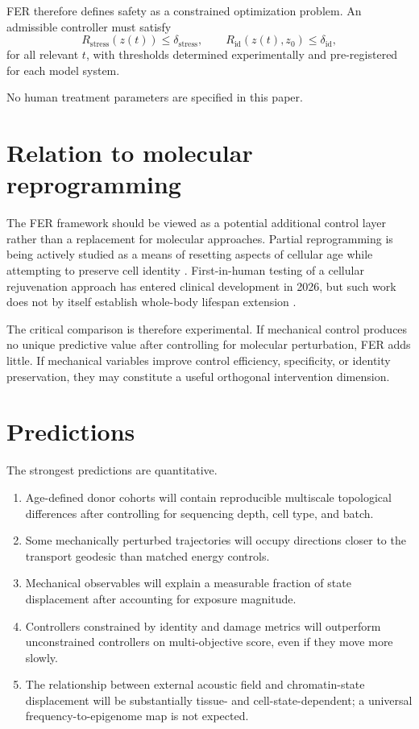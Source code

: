 \documentclass[11pt]{article}
\begin{document}
FER therefore defines safety as a constrained optimization problem. An admissible controller must satisfy
\begin{equation}
 R_{\mathrm{stress}}(z(t))\leq \delta_{\mathrm{stress}},
\qquad
 R_{\mathrm{id}}(z(t),z_0)\leq \delta_{\mathrm{id}},
\label{eq:constraints}
\end{equation}
for all relevant $t$, with thresholds determined experimentally and pre-registered for each model system.

No human treatment parameters are specified in this paper.

\section{Relation to molecular reprogramming}
The FER framework should be viewed as a potential additional control layer rather than a replacement for molecular approaches. Partial reprogramming is being actively studied as a means of resetting aspects of cellular age while attempting to preserve cell identity \cite{yucel2024,li2026}. First-in-human testing of a cellular rejuvenation approach has entered clinical development in 2026, but such work does not by itself establish whole-body lifespan extension \cite{naturebiotech2026}.

The critical comparison is therefore experimental. If mechanical control produces no unique predictive value after controlling for molecular perturbation, FER adds little. If mechanical variables improve control efficiency, specificity, or identity preservation, they may constitute a useful orthogonal intervention dimension.

\section{Predictions}
The strongest predictions are quantitative.
\begin{enumerate}[leftmargin=1.45em]
\item Age-defined donor cohorts will contain reproducible multiscale topological differences after controlling for sequencing depth, cell type, and batch.
\item Some mechanically perturbed trajectories will occupy directions closer to the transport geodesic than matched energy controls.
\item Mechanical observables will explain a measurable fraction of state displacement after accounting for exposure magnitude.
\item Controllers constrained by identity and damage metrics will outperform unconstrained controllers on multi-objective score, even if they move more slowly.
\item The relationship between external acoustic field and chromatin-state displacement will be substantially tissue- and cell-state-dependent; a universal frequency-to-epigenome map is not expected.
\end{enumerate}
\end{document}
